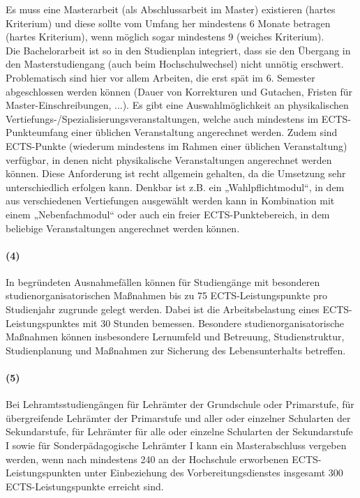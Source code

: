 \documentclass[a4paper]{scrartcl}
\begin{document}
\textcolor{Bernd}{\textbf{\cite{RESO: SoSe2002-RL}} Es muss eine Masterarbeit (als Abschlussarbeit im Master) existieren (hartes Kriterium) und diese sollte vom Umfang her mindestens 6 Monate betragen (hartes Kriterium), wenn möglich sogar mindestens 9 (weiches Kriterium).}\\ %

\textcolor{Bernd}{\textbf{\cite{RESO: WiSe2008-RL}} Die Bachelorarbeit ist so in den Studienplan integriert, dass sie den Übergang in den Masterstudiengang (auch beim Hochschulwechsel) nicht unnötig erschwert. Problematisch sind hier vor allem Arbeiten, die erst spät im 6. Semester abgeschlossen werden können (Dauer von Korrekturen und Gutachen, Fristen für Master-Einschreibungen, ...). Es gibt eine Auswahlmöglichkeit an physikalischen Vertiefungs-/Spe\-zi\-a\-li\-si\-erung\-sveranstaltungen, welche auch mindestens im ECTS-Punkteumfang einer üblichen Veranstaltung angerechnet werden. Zudem sind ECTS-Punkte (wiederum mindestens im Rahmen einer üblichen Veranstaltung) verfügbar, in denen nicht physikalische Veranstaltungen angerechnet werden  können.  Diese  Anforderung  ist  recht  allgemein  gehalten,  da  die  Umsetzung  sehr  unterschiedlich  erfolgen kann. Denkbar ist z.B. ein „Wahlpflichtmodul“, in dem aus verschiedenen Vertiefungen ausgewählt werden kann in Kombination mit einem „Nebenfachmodul“ oder auch ein freier ECTS-Punktebereich, in dem beliebige Veranstaltungen angerechnet werden können.}\\

\paragraph{(4)} In begründeten Ausnahmefällen können für Studiengänge mit besonderen
studienorganisatorischen Maßnahmen bis zu 75 ECTS-Leistungspunkte pro Studienjahr zugrunde gelegt werden. Dabei ist die Arbeitsbelastung eines ECTS-Leistungspunktes mit 30 Stunden bemessen. Besondere studienorganisatorische Maßnahmen können insbesondere Lernumfeld und Betreuung, Studienstruktur, Studienplanung und Maßnahmen zur Sicherung des Lebensunterhalts betreffen.
\paragraph{(5)} Bei Lehramtsstudiengängen für Lehrämter der Grundschule oder Primarstufe, für übergreifende Lehrämter der Primarstufe und aller oder einzelner Schularten der Sekundarstufe, für Lehrämter für alle oder einzelne Schularten der Sekundarstufe I sowie für Sonderpädagogische Lehrämter I kann ein Masterabschluss vergeben werden, wenn nach mindestens 240 an der Hochschule erworbenen ECTS-Leistungspunkten unter Einbeziehung des Vorbereitungsdienstes insgesamt 300 ECTS-Leistungspunkte erreicht sind.
\end{document}
